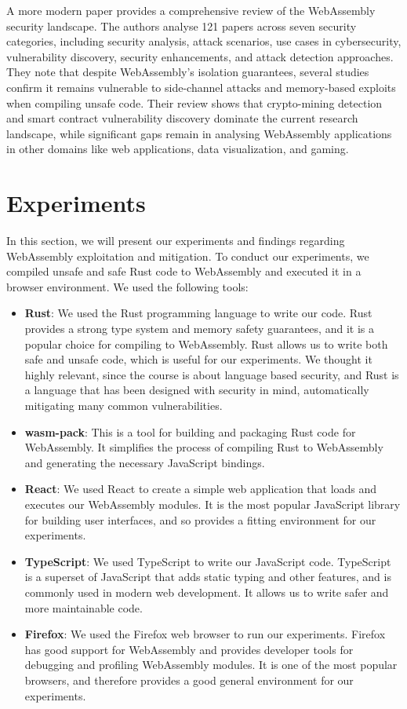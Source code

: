 \documentclass{article}
\begin{document}
A more modern paper \parencite{PERRONE2025100728} provides a comprehensive review of the WebAssembly security landscape. The authors analyse 121 papers across seven security categories, including security analysis, attack scenarios, use cases in cybersecurity, vulnerability discovery, security enhancements, and attack detection approaches. They note that despite WebAssembly's isolation guarantees, several studies confirm it remains vulnerable to side-channel attacks and memory-based exploits when compiling unsafe code. Their review shows that crypto-mining detection and smart contract vulnerability discovery dominate the current research landscape, while significant gaps remain in analysing WebAssembly applications in other domains like web applications, data visualization, and gaming.

\section{Experiments}
In this section, we will present our experiments and findings regarding WebAssembly exploitation and mitigation. To conduct our experiments, we compiled unsafe and safe Rust code to WebAssembly and executed it in a browser environment. We used the following tools:

\begin{itemize}
    \item \textbf{Rust}: We used the Rust programming language to write our code. Rust provides a strong type system and memory safety guarantees, and it is a popular choice for compiling to WebAssembly. Rust allows us to write both safe and unsafe code, which is useful for our experiments. We thought it highly relevant, since the course is about language based security, and Rust is a language that has been designed with security in mind, automatically mitigating many common vulnerabilities.
    \item \textbf{wasm-pack}: This is a tool for building and packaging Rust code for WebAssembly. It simplifies the process of compiling Rust to WebAssembly and generating the necessary JavaScript bindings.
    \item \textbf{React}: We used React to create a simple web application that loads and executes our WebAssembly modules. It is the most popular JavaScript library for building user interfaces, and so provides a fitting environment for our experiments.
    \item \textbf{TypeScript}: We used TypeScript to write our JavaScript code. TypeScript is a superset of JavaScript that adds static typing and other features, and is commonly used in modern web development. It allows us to write safer and more maintainable code.
    \item \textbf{Firefox}: We used the Firefox web browser to run our experiments. Firefox has good support for WebAssembly and provides developer tools for debugging and profiling WebAssembly modules. It is one of the most popular browsers, and therefore provides a good general environment for our experiments.
\end{itemize}
\end{document}
